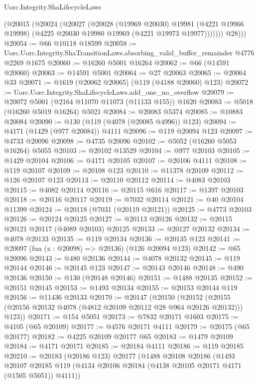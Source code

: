 \begin{lexlean}{Uorc.Integrity.ShaLifecycleLaws}
\begin{coremodule}
            (@20015
              (@20024
                (@20027
                  (@20028
                    (@19969 @20030)
                    @19981
                    (@4221 @19966 @19998)
                    (@4225 @20030 @19980 @19969 (@4221 @19973 @19977)))))))
          @28)))
@20054 := @66 @10118 @18599
@20058 := Uorc.Uorc.Integrity.ShaTransitionLaws.absorbing_valid_buffer_remainder @4776 @2269 @1675
@20060 := @16260 @5001 @16264
@20062 := @66 (@14591 @20060)
@20063 := @14591 @5001
@20064 := @27 @20063
@20065 := @20064 @33
@20071 := @1619 (@20062 @20065) (@119 (@4188 @20060) @123)
@20072 := Uorc.Uorc.Integrity.ShaLifecycleLaws.add_one_no_overflow
@20079 := @20072 @5001 (@2164 @11070 @11073 (@11133 @155)) @1620
@20083 := @5018 (@16260 @5019 @16264) @5021
@20084 := @20083 @5374
@20085 := @10883 @20084
@20090 := @130 (@119 (@4078 (@20085 @4996)) @123)
@20094 := @4171 (@1429 (@977 @20084)) @4111
@20096 := @119 @20094 @123
@20097 := @4733 @20096
@20098 := @4735 @20096
@20102 := @5052 (@16260 @5053 @16264) @5055
@20103 := @20102 @13529
@20104 := @977 @20103
@20105 := @1429 @20104
@20106 := @4171 @20105
@20107 := @20106 @4111
@20108 := @119 @20107
@20109 := @20108 @123
@20110 := @11378 @20109
@20112 := @126 @20107 @123
@20113 := @20110 @20112
@20114 := @4083 @20103
@20115 := @4082 @20114
@20116 := @20115 @616
@20117 := @1397 @20103
@20118 := @20116 @20117
@20119 := @7032 @20114
@20121 := @40 @20104 @11399
@20124 := @20118 (@7031 (@20119 @20121))
@20125 := @4773 @20103
@20126 := @20124 @20125
@20127 := @20113 @20126
@20132 := @20115 @20121 @20117 (@4089 @20103) @20125
@20133 := @20127 @20132
@20134 := @4078 @20133
@20135 := @119 @20134
@20136 := @20135 @123
@20141 := @20097 (fun (x : @20098) => @20136) (@126 @20094 @123)
@20142 := @65 @20096
@20143 := @480 @20136
@20144 := @4078 @20132
@20145 := @119 @20144
@20146 := @20145 @123
@20147 := @20143 @20146
@20148 := @490 @20136
@20150 := @130 (@20148 @20146)
@20151 := @1488 @20135
@20152 := @20151 @20145
@20153 := @1493 @20134
@20155 := @20153 @20144 @119
@20156 := @11436 @20133
@20170 := @20147
    (@20150
      (@20152 (@20155 (@20156 @20132 @4078 (@4812 @20109 @20112 @28 @964 @20126 @20132))) @123))
@20171 := @154 @5051
@20173 := @7832 @20171 @1603
@20175 := @4105 (@65 @20109)
@20177 := @4576 @20171 @4111
@20179 := @20175 (@65 @20177)
@20182 := @4225 @20109 @20177 @65
@20183 := @1479 @20109
@20184 := @4171 @20171
@20185 := @20184 @4111
@20186 := @119 @20185
@20210 := @20183
    (@20186 @123)
    @20177
    (@1488
      @20108
      @20186
      (@1493
        @20107
        @20185
        @119
        (@4134 @20106 @20184 (@4138 @20105 @20171 @4171 (@1505 @5051)) @4111))

\end{coremodule}
\end{lexlean}
